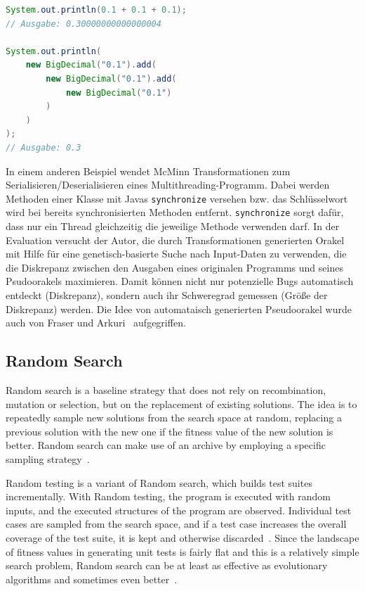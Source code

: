 \documentclass{article}
\begin{document}
\begin{lstlisting}[language=Java, caption=Comparing floating-point arithmetic in Java using double compared to BigDecimal~\cite{McMinn2009}, label=lst:java-transformations]
System.out.println(0.1 + 0.1 + 0.1);
// Ausgabe: 0.30000000000000004

System.out.println(
    new BigDecimal("0.1").add(
        new BigDecimal("0.1").add(
            new BigDecimal("0.1")
        )
    )
);
// Ausgabe: 0.3
\end{lstlisting}
In einem anderen Beispiel wendet McMinn Transformationen zum Serialisieren/Deserialisieren eines Multithreading-Programm. Dabei werden Methoden einer Klasse mit Javas \lstinline{synchronize} versehen bzw. das Schlüsselwort wird bei bereits synchronisierten Methoden entfernt. \lstinline{synchronize} sorgt dafür, dass nur ein Thread gleichzeitig die jeweilige Methode verwenden darf. In der Evaluation versucht der Autor, die durch Transformationen generierten Orakel mit Hilfe für eine genetisch-basierte Suche nach Input-Daten zu verwenden, die die Diskrepanz zwischen den Ausgaben eines originalen Programms und seines Psudoorakels maximieren. Damit können nicht nur potenzielle Bugs automatisch entdeckt (Diskrepanz), sondern auch ihr Schweregrad gemessen (Größe der Diskrepanz) werden. Die Idee von automataisch generierten Pseudoorakel wurde auch von Fraser und Arkuri~\cite{Fraser_2013} aufgegriffen. 

\subsection{Random Search}
Random search is a baseline strategy that does not rely on recombination, mutation or selection, but on the replacement of existing solutions. The idea is to repeatedly sample new solutions from the search space at random, replacing a previous solution with the new one if the fitness value of the new solution is better. Random search can make use of an archive by employing a specific sampling strategy~\cite{Campos2017}.

Random testing is a variant of Random search, which builds test suites incrementally. With Random testing, the program is executed with random inputs, and the executed structures of the program are observed. Individual test cases are sampled from the search space, and if a test case increases the overall coverage of the test suite, it is kept and otherwise discarded~\cite{Campos2017}. Since the landscape of fitness values in generating unit tests is fairly flat and this is a relatively simple search problem, Random search can be at least as effective as evolutionary algorithms and sometimes even better~\cite{Shamshiri2015a}.
\end{document}
